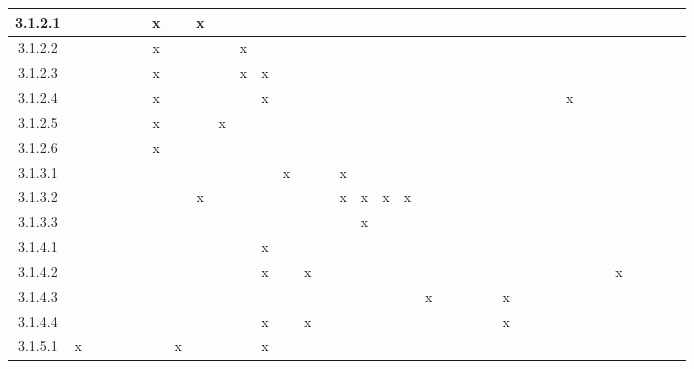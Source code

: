 \documentclass[titlepage]{article}
\begin{document}
\begin{center}
\begin{tabular}{ | c ||c | c | c | c | c | c | c | c | c | c | c | c | c | c | c | c | c | c | c | c | c | c | c | c | c | c | c | c | c | c | c | c | c | c | c |}
\hline
   3.1.2.1 & & & & & &x& &x& & & & & & & & & & & & & & & & & & & & & & & & & & &  \\ \hline
   3.1.2.2 & & & & & &x& & & &x& & & & & & & & & & & & & & & & & & & & & & & & & \\ \hline
   3.1.2.3 & & & & & &x& & & &x&x& & & & & & & & & & & & & & & & & & & & & & & & \\ \hline 
   3.1.2.4 & & & & & &x& & & & &x& & & & & & & & & & & & & & & & &x& & & & & & & \\ \hline
   3.1.2.5 & & & & & &x& & &x& & & & & & & & & & & & & & & & & & & & & & & & & & \\ \hline
   3.1.2.6 & & & & & &x& & & & & & & & & & & & & & & & & & & & & & & & & & & & & \\ \hline
   3.1.3.1 & & & & & & & & & & & &x& & &x& & & & & & & & & & & & & & & & & & & & \\ \hline
   3.1.3.2 & & & & & & & &x& & & & & & &x&x&x&x& & & & & & & & & & & & & & & & & \\ \hline
   3.1.3.3 & & & & & & & & & & & & & & & &x& & & & & & & & & & & & & & & & & & & \\ \hline
   3.1.4.1 & & & & & & & & & & &x& & & & & & & & & & & & & & & & & & & & & & & & \\ \hline
   3.1.4.2 & & & & & & & & & & &x& &x& & & & & & & & & & & & & & & & & &x& & & & \\ \hline
   3.1.4.3 & & & & & & & & & & & & & & & & & & &x& & & & &x& & & & & & & & & & & \\ \hline
   3.1.4.4 & & & & & & & & & & &x& &x& & & & & & & & & & &x& & & & & & & & & & & \\ \hline
   3.1.5.1 &x& & & & & &x& & & &x& & & & & & & & & & & & & & & & & & & & & & & & \\ \hline

\end{tabular}
\end{center}
\end{document}
